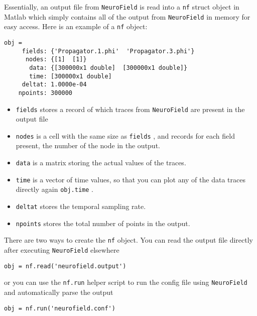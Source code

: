\documentclass[12pt,a4paper]{article}
\newcommand{\type}[1]{{\small\small\tt #1} }
\newcommand{\NF}[0]{\type{NeuroField}}
\begin{document}
Essentially, an output file from \NF is read into a \type{nf} struct object in Matlab which simply contains all of the output from \NF in memory for easy access. Here is an example of a \type{nf} object:
\begin{lstlisting}
obj =
     fields: {'Propagator.1.phi'  'Propagator.3.phi'}
      nodes: {[1]  [1]}
       data: {[300000x1 double]  [300000x1 double]}
       time: [300000x1 double]
     deltat: 1.0000e-04
    npoints: 300000
\end{lstlisting}
\begin{itemize}
\item \type{fields} stores a record of which traces from \NF are present in the output file
\item \type{nodes} is a cell with the same size as \type{fields}, and records for each field present, the number of the node in the output.
\item \type{data} is a matrix storing the actual values of the traces.
\item \type{time} is a vector of time values, so that you can plot any of the data traces directly again \type{obj.time}.
\item \type{deltat} stores the temporal sampling rate.
\item \type{npoints} stores the total number of points in the output.
\end{itemize}

There are two ways to create the \type{nf} object. You can read the output file directly after executing \NF elsewhere

\begin{lstlisting}
obj = nf.read('neurofield.output')
\end{lstlisting}

or you can use the \type{nf.run} helper script to run the config file using \NF and automatically parse the output

\begin{lstlisting}
obj = nf.run('neurofield.conf')
\end{lstlisting}

\end{document}
